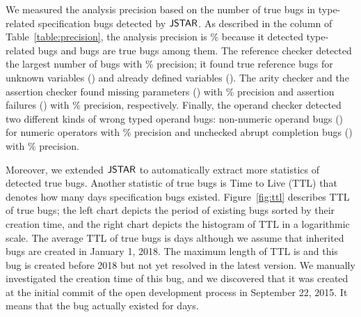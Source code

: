 We measured the analysis precision based on the number of true bugs in
type-related specification bugs detected by $\tool$.  As described in the
 column of Table~\ref{table:precision}, the analysis precision
is \% because it detected  type-related bugs and
 bugs are true bugs among them.  The reference checker detected the
largest number of bugs with \% precision; it found  true
reference bugs for  unknown variables () and
 already defined variables (). The arity
checker and the assertion checker found  missing parameters
() with \% precision and  assertion
failures () with \% precision, respectively.
Finally, the operand checker detected two different kinds of wrong typed operand
bugs:  non-numeric operand bugs () for numeric
operators with \% precision and  unchecked abrupt
completion bugs () with \% precision.

Moreover, we extended $\tool$ to automatically extract more statistics of
detected true bugs.    Another statistic of true bugs is Time to Live
(TTL) that denotes how many days specification bugs existed.
Figure~\ref{fig:ttl} describes TTL of true bugs; the left chart depicts the
period of existing bugs sorted by their creation time, and the right chart
depicts the histogram of TTL in a logarithmic scale.  The average TTL of true
bugs is  days although we assume that  inherited bugs are
created in January 1, 2018.  The maximum length of TTL is  and this
bug is created before 2018 but not yet resolved in the latest version.  We
manually investigated the creation time of this bug, and we discovered that it
was created at the initial commit of the open development process in September
22, 2015.  It means that the bug actually existed for  days.


